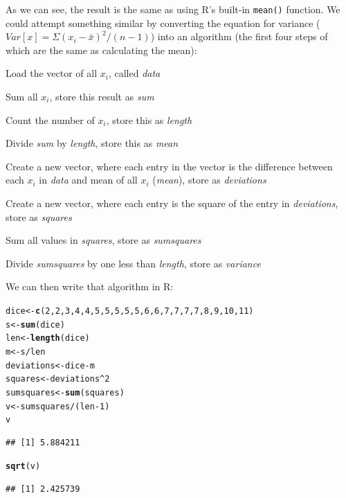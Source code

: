 \documentclass[12pt]{article}\usepackage[]{graphicx}\usepackage[]{color}
\makeatletter
\newcommand{\hlnum}[1]{\textcolor[rgb]{0.686,0.059,0.569}{#1}}%
\newcommand{\hlopt}[1]{\textcolor[rgb]{0,0,0}{#1}}%
\newcommand{\hlstd}[1]{\textcolor[rgb]{0.345,0.345,0.345}{#1}}%
\newcommand{\hlkwb}[1]{\textcolor[rgb]{0.69,0.353,0.396}{#1}}%
\newcommand{\hlkwd}[1]{\textcolor[rgb]{0.737,0.353,0.396}{\textbf{#1}}}%
\newenvironment{kframe}{%
 \def\at@end@of@kframe{}%
 \ifinner\ifhmode%
  \def\at@end@of@kframe{\end{minipage}}%
  \begin{minipage}{\columnwidth}%
 \fi\fi%
 \def\FrameCommand##1{\hskip\@totalleftmargin \hskip-\fboxsep
 \colorbox{shadecolor}{##1}\hskip-\fboxsep
     \hskip-\linewidth \hskip-\@totalleftmargin \hskip\columnwidth}%
 \MakeFramed {\advance\hsize-\width
   \@totalleftmargin\z@ \linewidth\hsize
   \@setminipage}}%
 {\par\unskip\endMakeFramed%
 \at@end@of@kframe}
\newenvironment{knitrout}{}{} %
\makeatother
\begin{document}
As we can see, the result is the same as using R's built-in \texttt{mean()} function. We could attempt something similar by converting the equation for variance ($Var[x]=\Sigma (x_{i} - \bar{x})^2 / (n-1)$) into an algorithm (the first four steps of which are the same as calculating the mean):
\begin{enumerate*}
\item Load the vector of all $x_i$, called \emph{data}
\item Sum all $x_i$, store this result as \emph{sum}
\item Count the number of $x_i$, store this as \emph{length}
\item Divide \emph{sum} by \emph{length}, store this as \emph{mean}
\item Create a new vector, where each entry in the vector is the difference between each $x_i$ in \emph{data} and mean of all $x_i$ (\emph{mean}),  store as \emph{deviations}
\item Create a new vector, where each entry is the square of the entry in \emph{deviations}, store as \emph{squares}
\item Sum all values in \emph{squares}, store as \emph{sumsquares}
\item Divide \emph{sumsquares} by one less than \emph{length}, store as \emph{variance}
\end{enumerate*}
We can then write that algorithm in R:
\begin{knitrout}
\color{fgcolor}\begin{kframe}
\begin{alltt}
\hlstd{dice} \hlkwb{<-} \hlkwd{c}\hlstd{(}\hlnum{2}\hlstd{,}\hlnum{2}\hlstd{,}\hlnum{3}\hlstd{,}\hlnum{4}\hlstd{,}\hlnum{4}\hlstd{,}\hlnum{5}\hlstd{,}\hlnum{5}\hlstd{,}\hlnum{5}\hlstd{,}\hlnum{5}\hlstd{,}\hlnum{5}\hlstd{,}\hlnum{6}\hlstd{,}\hlnum{6}\hlstd{,}\hlnum{7}\hlstd{,}\hlnum{7}\hlstd{,}\hlnum{7}\hlstd{,}\hlnum{7}\hlstd{,}\hlnum{8}\hlstd{,}\hlnum{9}\hlstd{,}\hlnum{10}\hlstd{,}\hlnum{11}\hlstd{)}
\hlstd{s} \hlkwb{<-} \hlkwd{sum}\hlstd{(dice)}
\hlstd{len} \hlkwb{<-} \hlkwd{length}\hlstd{(dice)}
\hlstd{m} \hlkwb{<-} \hlstd{s}\hlopt{/}\hlstd{len}
\hlstd{deviations} \hlkwb{<-} \hlstd{dice}\hlopt{-}\hlstd{m}
\hlstd{squares} \hlkwb{<-} \hlstd{deviations}\hlopt{^}\hlnum{2}
\hlstd{sumsquares} \hlkwb{<-} \hlkwd{sum}\hlstd{(squares)}
\hlstd{v} \hlkwb{<-} \hlstd{sumsquares}\hlopt{/}\hlstd{(len}\hlopt{-}\hlnum{1}\hlstd{)}
\hlstd{v}
\end{alltt}
\begin{verbatim}
## [1] 5.884211
\end{verbatim}
\begin{alltt}
\hlkwd{sqrt}\hlstd{(v)}
\end{alltt}
\begin{verbatim}
## [1] 2.425739
\end{verbatim}
\end{kframe}
\end{knitrout}
\end{document}
